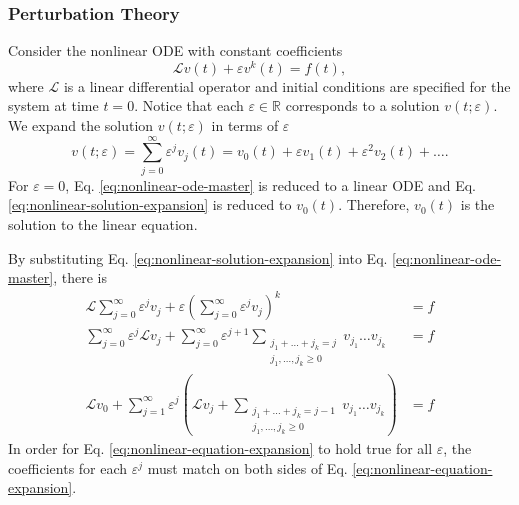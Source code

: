 \documentclass{article}
\renewcommand{\L}{\mathcal{L}}
\begin{document}
\subsubsection{Perturbation Theory} \label{section:perturbation-theory}
    Consider the nonlinear ODE with constant coefficients
    \begin{equation} \label{eq:nonlinear-ode-master}
        \L v(t) + \varepsilon v^k(t) = f(t),
    \end{equation}
    where $\L$ is a linear differential operator and initial conditions are specified for the system at time $t=0$. 
    Notice that each $\varepsilon \in \mathbb{R}$ corresponds to a solution $v(t; \varepsilon)$. 
    We expand the solution $v(t; \varepsilon)$ in terms of $\varepsilon$
    \begin{equation} \label{eq:nonlinear-solution-expansion}
        v(t; \varepsilon) = \sum_{j=0}^{\infty} \varepsilon^j v_j(t) = v_0(t) + \varepsilon v_1(t) + \varepsilon^2 v_2(t) + \dots.
    \end{equation}
    For $\varepsilon = 0$, Eq. \ref{eq:nonlinear-ode-master} is reduced to a linear ODE and Eq. \ref{eq:nonlinear-solution-expansion} is reduced to $v_0(t)$. Therefore, $v_0(t)$ is the solution to the linear equation. 

    By substituting Eq. \ref{eq:nonlinear-solution-expansion} into Eq. \ref{eq:nonlinear-ode-master}, there is
    \begin{align}
        \L \sum_{j=0}^{\infty} \varepsilon^j v_j + \varepsilon \left(\sum_{j=0}^{\infty} \varepsilon^j v_j\right)^k &= f \\
        \sum_{j=0}^{\infty} \varepsilon^j \L v_j + \sum_{j=0}^{\infty} \varepsilon^{j+1} \sum_{\substack{j_1+\dots+j_k = j\\j_1, \dots, j_k \geq 0}}v_{j_1}\dots v_{j_k} &= f \\ 
        \L v_0 + \sum_{j=1}^{\infty} \varepsilon^j \left(\L v_j + \sum_{\substack{j_1+\dots+j_k = j - 1\\j_1, \dots, j_k \geq 0}}v_{j_1}\dots v_{j_k}\right)&= f \label{eq:nonlinear-equation-expansion} 
    \end{align}
    In order for Eq. \ref{eq:nonlinear-equation-expansion} to hold true for all $\varepsilon$, the coefficients for each $\varepsilon^j$ must match on both sides of Eq. \ref{eq:nonlinear-equation-expansion}.
\end{document}

